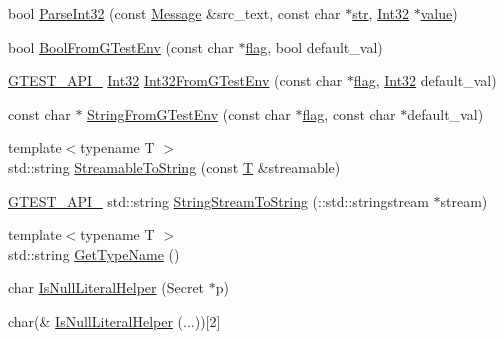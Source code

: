 \begin{DoxyCompactItemize}
bool \hyperlink{namespacetesting_1_1internal_ac06fc81336a3d80755f4020d34321766}{Parse\-Int32} (const \hyperlink{classtesting_1_1Message}{Message} \&src\-\_\-text, const char $\ast$\hyperlink{core__c_8h_a5f3a65d240411b0018990ff992b348c0}{str}, \hyperlink{namespacetesting_1_1internal_a8ee38faaf875f133358abaf9bc056cec}{Int32} $\ast$\hyperlink{highgui__c_8h_ad4670c92695d4327c21292905a803901}{value})
\item 
bool \hyperlink{namespacetesting_1_1internal_a67132cdce23fb71b6c38ee34ef81eb4c}{Bool\-From\-G\-Test\-Env} (const char $\ast$\hyperlink{legacy_8hpp_a0b4706eb64be40850fe9d384ecc82267}{flag}, bool default\-\_\-val)
\item 
\hyperlink{ts__gtest_8h_aa73be6f0ba4a7456180a94904ce17790}{G\-T\-E\-S\-T\-\_\-\-A\-P\-I\-\_\-} \hyperlink{namespacetesting_1_1internal_a8ee38faaf875f133358abaf9bc056cec}{Int32} \hyperlink{namespacetesting_1_1internal_a227ce16736a6992fcd13ac3cd23ef1f1}{Int32\-From\-G\-Test\-Env} (const char $\ast$\hyperlink{legacy_8hpp_a0b4706eb64be40850fe9d384ecc82267}{flag}, \hyperlink{namespacetesting_1_1internal_a8ee38faaf875f133358abaf9bc056cec}{Int32} default\-\_\-val)
\item 
const char $\ast$ \hyperlink{namespacetesting_1_1internal_a72099045bb72303860b2138658a5f6ee}{String\-From\-G\-Test\-Env} (const char $\ast$\hyperlink{legacy_8hpp_a0b4706eb64be40850fe9d384ecc82267}{flag}, const char $\ast$default\-\_\-val)
\item 
{\footnotesize template$<$typename T $>$ }\\std\-::string \hyperlink{namespacetesting_1_1internal_aad4beed95d0846e6ffc5da0978ef3bb9}{Streamable\-To\-String} (const \hyperlink{calib3d_8hpp_a3efb9551a871ddd0463079a808916717}{T} \&streamable)
\item 
\hyperlink{ts__gtest_8h_aa73be6f0ba4a7456180a94904ce17790}{G\-T\-E\-S\-T\-\_\-\-A\-P\-I\-\_\-} std\-::string \hyperlink{namespacetesting_1_1internal_a75bdbc38815772055696b2a40bae614e}{String\-Stream\-To\-String} (\-::std\-::stringstream $\ast$stream)
\item 
{\footnotesize template$<$typename T $>$ }\\std\-::string \hyperlink{namespacetesting_1_1internal_a635606b4731f843c86ec8ca51cab83a1}{Get\-Type\-Name} ()
\item 
char \hyperlink{namespacetesting_1_1internal_afb0731ba39ffef1fa1730ac0699c9025}{Is\-Null\-Literal\-Helper} (Secret $\ast$p)
\item 
char(\& \hyperlink{namespacetesting_1_1internal_ab53ecfa1632a871ce7c692d722a75a57}{Is\-Null\-Literal\-Helper} (...))\mbox{[}2\mbox{]}

\end{DoxyCompactItemize}
